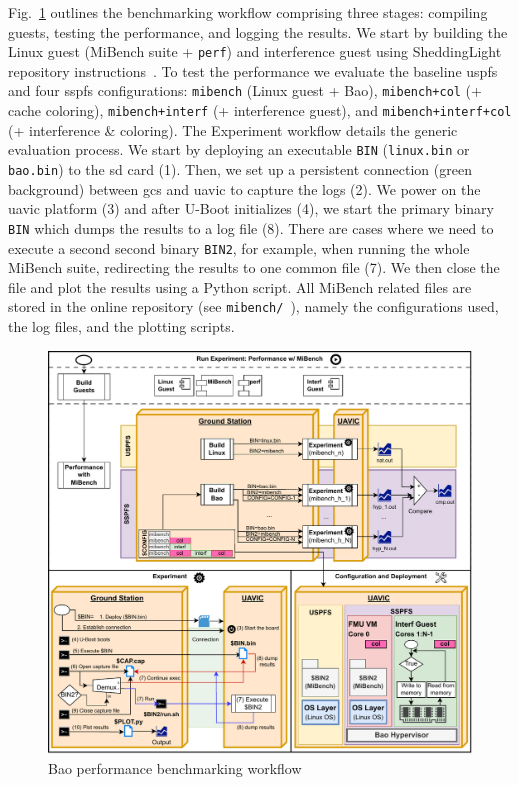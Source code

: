 Fig.~\ref{fig:uav-main-eval-mibench} outlines the benchmarking workflow
comprising three stages: compiling guests, testing the performance, and logging
the results. We start by building the Linux guest (MiBench suite +
\lstinline{perf}) and interference guest using SheddingLight repository
instructions~\cite{shedlightRepo}.
To test the performance we evaluate the
baseline \gls{uspfs} and four \gls{sspfs} configurations: \lstinline{mibench}
(Linux guest + Bao), \lstinline{mibench+col} (+ cache coloring),
\lstinline{mibench+interf} (+ interference guest), and
\lstinline{mibench+interf+col} (+ interference \& coloring).
%
The Experiment workflow details the generic evaluation process. We start by
deploying an executable \lstinline{BIN} (\lstinline{linux.bin} or
\lstinline{bao.bin}) to the \gls{sd} card (1). Then, we set up a persistent
connection (green background) between \gls{gcs} and \gls{uavic} to capture the
logs (2). We power on the \gls{uavic} platform (3) and after U-Boot
initializes (4), we start the primary binary \lstinline{BIN} which dumps the
results to a log file (8). There are cases where we need to execute a second
second binary \lstinline{BIN2}, for example, when running the whole MiBench
suite, redirecting the results to one common file (7). We then close the file
and plot the results using a Python script. All MiBench related files are stored
in the online repository (see \lstinline{mibench/}~\cite{thesis-sw-github}),
namely the configurations used, the log files, and the plotting scripts.

\begin{figure}[!hbt]
  \centering
  \includegraphics[width=1.0\textwidth]{./img/pdf/uav-main-eval-mibench} 
  \caption{Bao performance benchmarking workflow}%
  \label{fig:uav-main-eval-mibench}
\end{figure}

